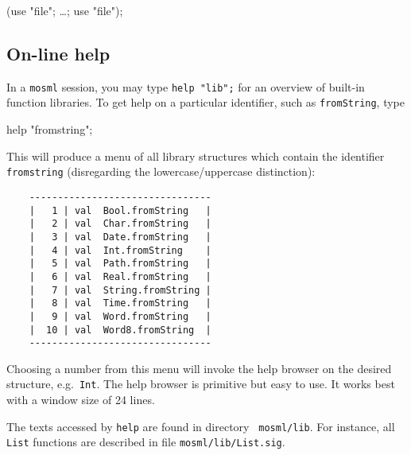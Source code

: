 \documentclass[fleqn]{article}
\begin{document}
\begin{program}
(use "file"; \ldots; use "file");  
\end{program}


\subsection{On-line help}
\label{sec-mosml-help}

In a {\tt mosml} session, you may type {\tt help "lib";} for an
overview of built-in function libraries.  To get help on a particular
identifier, such as {\tt fromString}, type

\begin{program}
help "fromstring";
\end{program}

\noindent This will produce a menu of all library structures which
contain the identifier {\tt fromstring} (disregarding the
lowercase/uppercase distinction):

{\small\begin{verbatim}
    --------------------------------
    |   1 | val  Bool.fromString   |
    |   2 | val  Char.fromString   |
    |   3 | val  Date.fromString   |
    |   4 | val  Int.fromString    |
    |   5 | val  Path.fromString   |
    |   6 | val  Real.fromString   |
    |   7 | val  String.fromString |
    |   8 | val  Time.fromString   |
    |   9 | val  Word.fromString   |
    |  10 | val  Word8.fromString  |
    --------------------------------
\end{verbatim}}

\noindent Choosing a number from this menu will invoke the help
browser on the desired structure, e.g.\ {\tt Int}.  The help browser
is primitive but easy to use.  It works best with a window size of 24
lines.

The texts accessed by {\tt help} are found in directory {\tt
  mosml/lib}.  For instance, all {\tt List} functions are described in
file {\tt mosml/lib/List.sig}.
\end{document}
